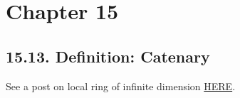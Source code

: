 \section{Chapter 15}

\subsection{15.13. Definition: Catenary}

See a post on local ring of infinite dimension \href{https://mathoverflow.net/questions/310838/local-ring-of-infinite-dimension}{HERE}.